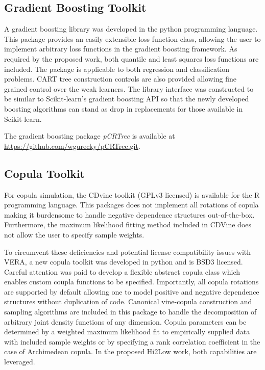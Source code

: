 \subsection{Gradient Boosting Toolkit}

A gradient boosting library was developed in the python programming language.  This package provides an easily extensible loss function class, allowing the user to implement arbitrary loss functions in the gradient boosting framework.  As required by the proposed work, both quantile and least squares loss functions are included.  The package is applicable to both regression and classification problems.  CART tree construction controls are also provided allowing fine grained control over the weak learners.
The library interface was constructed to be similar to Scikit-learn's gradient boosting API so that the newly developed boosting algorithms can stand as drop in replacements for those available in Scikit-learn.

The gradient boosting package \emph{pCRTree} is available at \url{https://github.com/wgurecky/pCRTree.git}.

\subsection{Copula Toolkit}

For copula simulation, the CDvine toolkit (GPLv3 licensed) is available for the R programming language. This packages does not implement all rotations of copula making it burdensome to handle negative dependence structures out-of-the-box.  Furthermore, the maximum likelihood fitting method included in CDVine does not allow the user to specify sample weights.

To circumvent these deficiencies and potential license compatibility issues with VERA, a new copula toolkit was developed in python and is BSD3 licensed.
Careful attention was paid to develop a flexible abstract copula class which enables custom coupla functions to be specified.  Importantly, all copula rotations are supported by default allowing one to model positive and negative dependence structures without duplication of code.
Canonical vine-copula construction and sampling algorithms are included in this package to handle the decomposition of arbitrary joint density functions of any dimension.
Copula parameters can be determined by a weighted maximum likelihood fit to empirically supplied data with included sample weights or by specifying a rank correlation coefficient in the case of Archimedean copula.  In the proposed Hi2Low work, both capabilities are leveraged.

